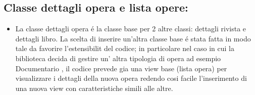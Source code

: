 \documentclass[10pt]{article}
\begin{document}
\subsection{Classe dettagli opera e lista opere:}
\begin{itemize}
\item La classe dettagli opera  \'e la classe base per 2 altre classi: dettagli rivista e dettagli libro. La scelta di inserire un'altra classe base \'e stata fatta in modo tale da favorire l'estensibilit del codice; in particolare nel caso in cui la biblioteca decida di gestire un' altra tipologia di opera ad esempio Documentario , il codice prevede gia una view base (lista opera) per visualizzare i dettagli della nuova opera redendo cosi facile l'inserimento di una nuova view con caratteristiche simili alle altre.
\end{itemize}
\end{document}
